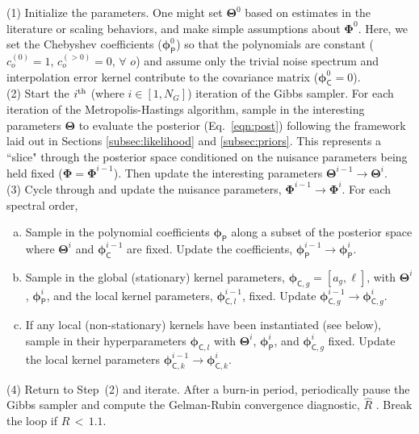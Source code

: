 \documentclass[iop,floatfix,numberedappendix,twocolappendix]{emulateapj}
\newcommand{\vT}{ {\bm \Theta}}
\newcommand{\vp}{ {\bm \phi}}
\newcommand{\vP}{ {\bm \Phi}}
\newcommand{\cheb}{ \vp_{\mathsf{P}}}
\newcommand{\cov}{ \vp_{\mathsf{C}}}
\begin{document}
\noindent (1) Initialize the parameters.  One might set $\vT^0$ based on estimates in the 
literature or scaling behaviors, and make simple assumptions about $\vP^0$.  Here, we set the 
Chebyshev coefficients ($\cheb^0$) so that the polynomials are constant ($c_o^{(0)} = 1$,  
$c_o^{(>0)} = 0$, $\forall$ $o$) and assume only the trivial noise spectrum and interpolation error 
kernel contribute to the covariance matrix ($\cov^0 = 0$).  \\

\noindent (2) Start the $i^{\rm th}$ (where $i \in [1,N_G]$) iteration of the Gibbs sampler.  For 
each iteration of the Metropolis-Hastings algorithm, sample in the interesting parameters $\vT$ to 
evaluate the posterior (Eq.~\ref{eqn:post}) following the framework laid out in Sections 
\ref{subsec:likelihood} and \ref{subsec:priors}.  This represents a ``slice" through the posterior 
space conditioned on the nuisance parameters being held fixed ($\vP = \vP^{i-1}$).  Then update the 
interesting parameters $\vT^{i-1} \rightarrow \vT^i$. \\

\noindent (3) Cycle through and update the nuisance parameters, $\vP^{i-1} \rightarrow \vP^i$.  For 
each spectral order,   

\begin{enumerate}[(a)]
\item Sample in the polynomial coefficients $\cheb$ along a subset of the posterior space where 
$\vT^i$ and $\cov^{i-1}$ are fixed.  Update the coefficients, $\cheb^{i-1} \rightarrow \cheb^i$.  

\item Sample in the global (stationary) kernel parameters, $\vp_{{\mathsf C},g} = [a_g, \ell]$, 
with $\vT^i$, $\cheb^i$, and the local kernel parameters, $\vp_{{\mathsf C}, l}^{i-1}$, fixed.  
Update $\vp_{{\mathsf C}, g}^{i-1} \rightarrow \vp_{{\mathsf C}, g}^i$.

\item If any local (non-stationary) kernels have been instantiated (see below), sample in their 
hyperparameters $\vp_{{\mathsf C},l}$ with $\vT^i$, $\cheb^i$, and $\vp_{{\mathsf C}, g}^i$ fixed.  
Update the local kernel parameters $\vp_{{\mathsf C}, k}^{i-1} \rightarrow \vp_{{\mathsf C}, k}^i$. 

\end{enumerate}

\noindent (4) Return to Step~(2) and iterate.  After a burn-in period, periodically pause the Gibbs 
sampler and compute the Gelman-Rubin convergence diagnostic, $\hat{R}$ \citep[][their 
Eq.~11.4]{gelman13}.  Break the loop if $\hat{R} \, < \, 1.1$.  \\
\end{document}
